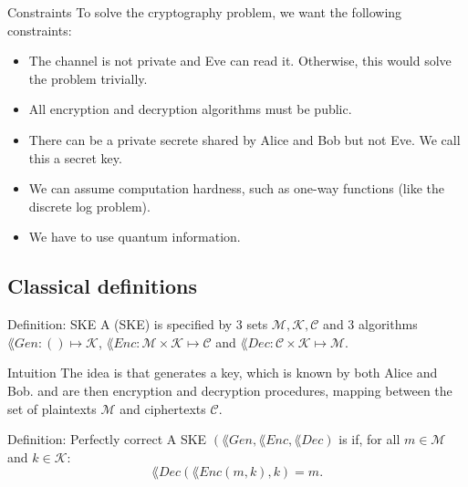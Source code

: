 \documentclass[a4paper]{article}
\begin{document}
\begin{parag}{Constraints}
    To solve the cryptography problem, we want the following constraints:
    \begin{itemize}
        \item The channel is not private and Eve can read it. Otherwise, this would solve the problem trivially.
        \item All encryption and decryption algorithms must be public.
        \item There can be a private secrete shared by Alice and Bob but not Eve. We call this a secret key.
        \item We can assume computation hardness, such as one-way functions (like the discrete log problem).
        \item We have to use quantum information.
    \end{itemize}
\end{parag}


\subsection{Classical definitions}

\begin{parag}{Definition: SKE}
    A  (SKE) is specified by 3 sets $\mathcal{M}, \mathcal{K}, \mathcal{C}$ and 3 algorithms $\lang{Gen}: \left(\right) \mapsto \mathcal{K}$, $\lang{Enc}: \mathcal{M} \times \mathcal{K} \mapsto \mathcal{C}$ and $\lang{Dec}: \mathcal{C} \times \mathcal{K} \mapsto \mathcal{M}$.

    \begin{subparag}{Intuition}
        The idea is that  generates a key, which is known by both Alice and Bob.  and  are then encryption and decryption procedures, mapping between the set of plaintexts $\mathcal{M}$ and ciphertexts $\mathcal{C}$.
    \end{subparag}
\end{parag}

\begin{parag}{Definition: Perfectly correct}
    A SKE $\left(\lang{Gen}, \lang{Enc}, \lang{Dec}\right)$ is  if, for all $m \in \mathcal{M}$ and $k \in \mathcal{K}$: 
    \[\lang{Dec}\left(\lang{Enc}\left(m, k\right), k\right) = m.\]
\end{parag}
\end{document}
